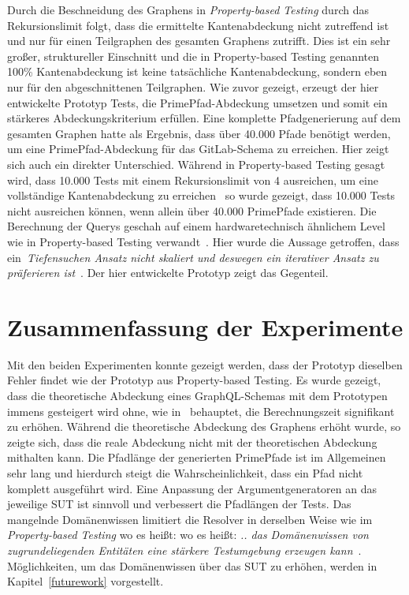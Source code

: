 Durch die Beschneidung des Graphens in \textit{Property-based Testing} durch das Rekursionslimit folgt, dass die ermittelte Kantenabdeckung
nicht zutreffend ist und nur für einen Teilgraphen des gesamten Graphens zutrifft.
Dies ist ein sehr großer, struktureller Einschnitt und die in Property-based Testing genannten 100\% Kantenabdeckung ist keine tatsächliche Kantenabdeckung,
sondern eben nur für den abgeschnittenen Teilgraphen.
Wie zuvor gezeigt, erzeugt der hier entwickelte Prototyp Tests, die PrimePfad-Abdeckung umsetzen und somit ein stärkeres Abdeckungskriterium erfüllen.
Eine komplette Pfadgenerierung auf dem gesamten Graphen hatte als Ergebnis, dass über 40.000 Pfade benötigt werden, um eine PrimePfad-Abdeckung für das GitLab-Schema zu erreichen.
Hier zeigt sich auch ein direkter Unterschied.
Während in Property-based Testing gesagt wird, dass 10.000 Tests mit einem Rekursionslimit von 4 ausreichen, um eine vollständige Kantenabdeckung zu erreichen~\cite[vgl. Table 1]{property-based-testing}
so wurde gezeigt, dass 10.000 Tests nicht ausreichen können, wenn allein über 40.000 PrimePfade existieren.
Die Berechnung der Querys geschah auf einem hardwaretechnisch ähnlichem Level wie in Property-based Testing verwandt~\cite[vgl. Experimental Setup]{property-based-testing}.
Hier wurde die Aussage getroffen, dass ein~\textit{Tiefensuchen Ansatz nicht skaliert und deswegen ein iterativer Ansatz zu präferieren ist}~\cite{property-based-testing}.
Der hier entwickelte Prototyp zeigt das Gegenteil.

\section{Zusammenfassung der Experimente}

Mit den beiden Experimenten konnte gezeigt werden, dass der Prototyp dieselben Fehler findet wie der Prototyp aus Property-based Testing.
Es wurde gezeigt, dass die theoretische Abdeckung eines GraphQL-Schemas mit dem Prototypen immens gesteigert wird ohne,
wie in~\cite{property-based-testing} behauptet, die Berechnungszeit signifikant zu erhöhen.
Während die theoretische Abdeckung des Graphens erhöht wurde, so zeigte sich, dass die reale Abdeckung nicht mit der theoretischen Abdeckung mithalten kann.
Die Pfadlänge der generierten PrimePfade ist im Allgemeinen sehr lang und hierdurch steigt die Wahrscheinlichkeit, dass ein Pfad nicht komplett ausgeführt wird.
Eine Anpassung der Argumentgeneratoren an das jeweilige SUT ist sinnvoll und verbessert die Pfadlängen der Tests.
Das mangelnde Domänenwissen limitiert die Resolver in derselben Weise wie im \textit{Property-based Testing} wo es heißt: wo es heißt:
\textit{.. das Domänenwissen von zugrundeliegenden Entitäten eine stärkere Testumgebung erzeugen kann}~\cite[S.8]{property-based-testing}.
Möglichkeiten, um das Domänenwissen über das SUT zu erhöhen, werden in Kapitel~\ref{futurework} vorgestellt.
